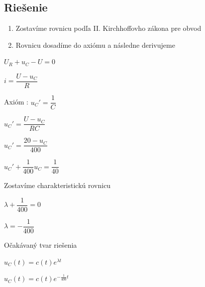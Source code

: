 \documentclass[10pt,a4paper]{article}
\begin{document}
 \vspace*{0.5cm}
 
 \subsection*{Riešenie}
 \begin{enumerate}
\item Zostavíme rovnicu podľa II. Kirchhoffovho zákona pre obvod
\item Rovnicu dosadíme do axiómu a následne derivujeme
\end{enumerate}

\vspace*{0.5cm}

	$U_{R} + u_{C} - U = 0$
	
	\vspace*{0.1cm}
	
	$i = \dfrac{U - u_{C}}{R}$
	
	\vspace*{0.1cm}
	
	Axióm : $u_{C}' =\dfrac{1}{C}$
	
	\vspace*{0.1cm}
	
	$u_{C}' =\dfrac{U - u_{C}}{RC}$
	
	\vspace*{0.1cm}
	
	$u_{C}' =\dfrac{20 - u_{C}}{400}$
	
	\vspace*{0.1cm}
	
	$u_{C}' + \dfrac{1}{400}u_{C} = \dfrac{1}{40}$
	

	\newpage
	Zostavíme charakteristickú rovnicu
	\vspace*{0.1cm}
	
	$\lambda + \dfrac{1}{400} = 0$
	
	\vspace*{0.1cm}
	
	$\lambda = -\dfrac{1}{400}$
	
	\vspace*{0.1cm}

	Očakávaný tvar riešenia
	
	\vspace*{0.1cm}
	
	$u_{C}(t) = c(t)e^{\lambda t}$
	
	\vspace*{0.1cm}
	
	$u_{C}(t) = c(t)e^{-\frac{1}{400}t}$
	
	\vspace*{0.1cm}
	
\end{document}
